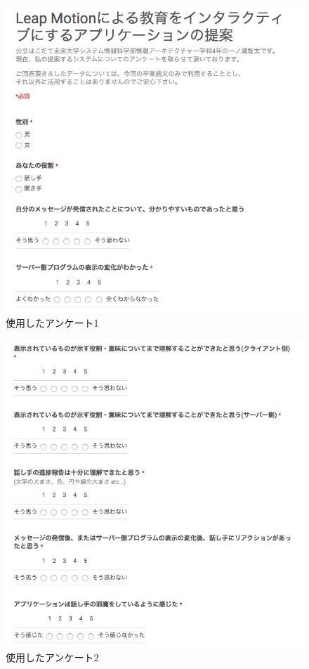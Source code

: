 \documentclass{funthesis}
\begin{document}
 \begin{figure}[H]
 \begin{center}
  \includegraphics[width=120mm]{./img/ank1.png}
 \end{center}
 \caption{使用したアンケート1}
 \label{leap}
\end{figure}

 \begin{figure}[H]
 \begin{center}
  \includegraphics[width=120mm]{./img/ank2.png}
 \end{center}
 \caption{使用したアンケート2}
 \label{leap}
\end{figure}
\end{document}
